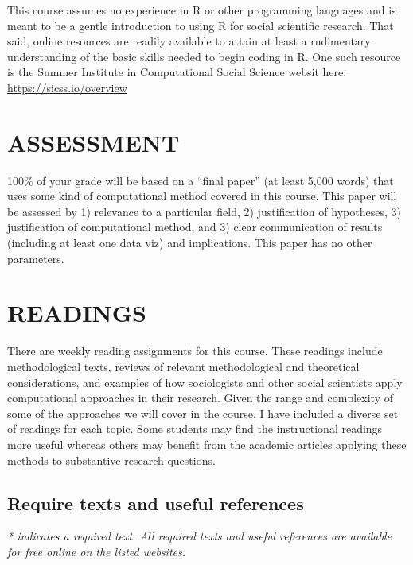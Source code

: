 \documentclass[
  10pt,
]{article}
\begin{document}
This course assumes no experience in R or other programming languages
and is meant to be a gentle introduction to using R for social
scientific research. That said, online resources are readily available
to attain at least a rudimentary understanding of the basic skills
needed to begin coding in R. One such resource is the Summer Institute
in Computational Social Science websit here:
\url{https://sicss.io/overview}

\hypertarget{assessment}{%
\section{ASSESSMENT}\label{assessment}}

100\% of your grade will be based on a ``final paper'' (at least 5,000
words) that uses some kind of computational method covered in this
course. This paper will be assessed by 1) relevance to a particular
field, 2) justification of hypotheses, 3) justification of computational
method, and 3) clear communication of results (including at least one
data viz) and implications. This paper has no other parameters.

\hypertarget{readings}{%
\section{READINGS}\label{readings}}

There are weekly reading assignments for this course. These readings
include methodological texts, reviews of relevant methodological and
theoretical considerations, and examples of how sociologists and other
social scientists apply computational approaches in their research.
Given the range and complexity of some of the approaches we will cover
in the course, I have included a diverse set of readings for each topic.
Some students may find the instructional readings more useful whereas
others may benefit from the academic articles applying these methods to
substantive research questions.

\hypertarget{require-texts-and-useful-references}{%
\subsection{Require texts and useful
references}\label{require-texts-and-useful-references}}

\emph{* indicates a required text. All required texts and useful
references are available for free online on the listed websites.}
\end{document}
